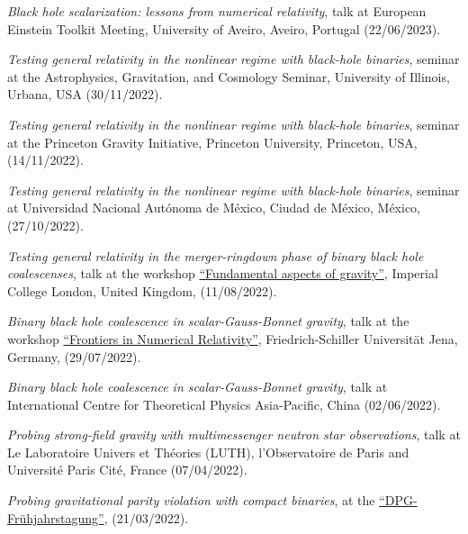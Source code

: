 \documentclass[10pt]{article}
\newcommand{\invited}{{\color{aeilbl}{invited}}}
\begin{document}
\begin{bibenum}
    \item \emph{Black hole scalarization: lessons from numerical relativity},
    \invited{} talk at European Einstein Toolkit Meeting, University of Aveiro, Aveiro, Portugal
    \hfill (22/06/2023).

    \item \emph{Testing general relativity in the nonlinear regime with black-hole binaries},
    seminar at the Astrophysics, Gravitation, and Cosmology Seminar, University of Illinois, Urbana, USA
    \hfill (30/11/2022).

    \item
    \emph{Testing general relativity in the nonlinear regime with black-hole binaries},
    \invited{} seminar at the Princeton Gravity Initiative, Princeton University, Princeton, USA,
    (14/11/2022).

    \item
    \emph{Testing general relativity in the nonlinear regime with black-hole binaries},
    \invited{} seminar at Universidad Nacional Aut\'onoma de M\'exico, Ciudad de M\'exico, M\'exico,
    (27/10/2022).

    \item
    \emph{Testing general relativity in the merger-ringdown phase of binary black hole coalescenses},
    \invited{} talk at the workshop \href{https://sites.google.com/view/fundamental-aspects-of-gravity}{``Fundamental aspects of gravity''}, Imperial College London, United Kingdom,
    (11/08/2022).

    \item
    \emph{Binary black hole coalescence in scalar-Gauss-Bonnet gravity},
    talk at the workshop \href{https://sites.google.com/view/fundamental-aspects-of-gravity}{``Frontiers in Numerical Relativity''}, Friedrich-Schiller Universit\"at Jena, Germany, (29/07/2022).

    \item
    \emph{Binary black hole coalescence in scalar-Gauss-Bonnet gravity},
    \invited{} talk at International Centre for Theoretical Physics Asia-Pacific,
    China
    (02/06/2022).

    \item
    \emph{Probing strong-field gravity with multimessenger neutron star observations},
    \invited{} talk at Le Laboratoire Univers et Th\'eories (LUTH), l'Observatoire de Paris and Universit\'e Paris Cit\'e,
    France
    (07/04/2022).

    \item
    \emph{Probing gravitational parity violation with compact binaries},
    at the \href{https://heidelberg22.dpg-tagungen.de/}{``DPG-Fr\"uhjahrstagung''},
    (21/03/2022).


\end{bibenum}
\end{document}
